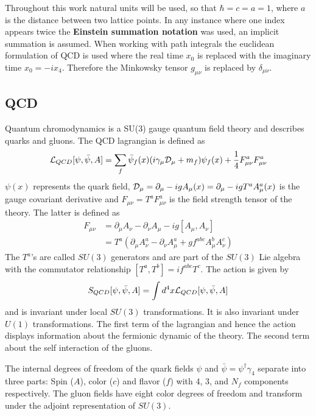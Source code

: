 Throughout this work natural units will be used, so that $\hbar = c = a = 1$, where $a$ is the distance between two lattice points.	In any instance where one index appears twice the \textbf{Einstein summation notation} was used, an implicit summation is assumed. When working with path integrals the euclidean formulation of QCD is used where the real time $x_0$ is replaced with the imaginary time $x_0 = -ix_4$. Therefore the Minkowsky tensor $g_{\mu\nu}$ is replaced by $\delta_{\mu\nu}$.
	
\subsection{QCD}
	Quantum chromodynamics is a SU(3) gauge quantum field theory and describes quarks and gluons. The QCD lagrangian is defined as \cite{qcd1_script_philipsen}
	\begin{equation}
	    \mathcal{L}_{QCD}[\psi,\bar{\psi}, A] = \sum_f \bar{\psi}_f(x)(i\gamma_\mu\mathcal{D}_\mu + m_f)\psi_f(x) + \frac{1}{4}F^a_{\mu\nu}F^a_{\mu\nu}
	    \label{qcd_lagrangian}
	\end{equation}
	$\psi(x)$ represents the quark field, $\mathcal{D}_\mu = \partial_\mu - igA_\mu(x) = \partial_\mu-igT^aA^a_\mu(x)$ is the gauge covariant derivative and $F_{\mu\nu} = T^aF^a_{\mu\nu}$ is the field strength tensor of the theory. The latter is defined as
	\begin{equation}\label{strenth_tensor}
	\begin{aligned}
	    F_{\mu\nu} &= \partial_\mu A_\nu - \partial_\nu A_\mu-ig[A_\mu,A_\nu]\\
	    &= T^a(\partial_\mu A^a_\nu - \partial_\nu A^a_\mu + g f^{abc}A^b_\mu A^c_\nu)
	\end{aligned}
	\end{equation}
	\noindent
	The $T^a$'s are called $SU(3)$ generators and are part of the $SU(3)$ Lie algebra with the commutator relationship $[T^a,T^b]=if^{abc}T^c$. The action is given by
	\begin{equation}
	    S_{QCD}[\psi,\bar{\psi}, A] = \int d^4x \mathcal{L}_{QCD}[\psi,\bar{\psi}, A]
	\end{equation}
	and is invariant under local $SU(3)$ transformations. It is also invariant under $U(1)$ transformations. The first term of the lagrangian and hence the action displays information about the fermionic dynamic of the theory. The second term about the self interaction of the gluons.
	
	The internal degrees of freedom of the quark fields $\psi$ and $\bar{\psi}=\psi^\dagger\gamma_4$ separate into three parts: Spin ($A$), color ($c$) and flavor ($f$) with 4, 3, and $N_f$ components respectively. The gluon fields have eight color degrees of freedom and transform under the adjoint representation of $SU(3)$.